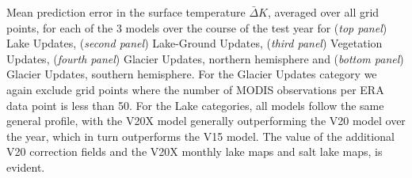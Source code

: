 \documentclass[hess, twostagejnl]{copernicus}
\providecommand{\DIFdel}[1]{{\protect\color{red} \scriptsize #1}} %
\providecommand{\DIFdelbegin}{} %
\providecommand{\DIFdelend}{} %
\providecommand{\DIFdelFL}[1]{\DIFdel{#1}} %
\begin{document}
\DIFdelbegin %
{%
\DIFdelFL{Mean prediction error in the surface temperature $\bar{\Delta} K$, averaged over all grid points, for each of the 3 models over the course of the test year for (\textit{top panel}) Lake Updates, (\textit{second panel}) Lake-Ground Updates, (\textit{third panel}) Vegetation Updates, (\textit{fourth panel}) Glacier Updates, northern hemisphere and (\textit{bottom panel}) Glacier Updates, southern hemisphere. For the Glacier Updates category we again exclude grid points where the number of MODIS observations per ERA data point is less than 50.  For the Lake categories, all models follow the same general profile, with the V20X model generally outperforming the V20 model over the year, which in turn outperforms the V15 model. The value of the additional V20 correction fields and the V20X monthly lake maps and salt lake maps, is evident.}}
\DIFdelend 
\end{document}
